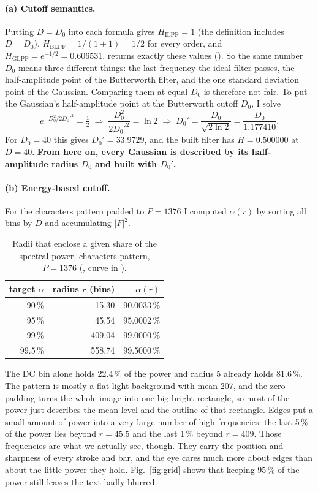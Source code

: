 \paragraph{(a) Cutoff semantics.} Putting $D=D_0$ into each formula gives
$H_\text{ILPF}=1$ (the definition includes $D=D_0$), $H_\text{BLPF}=1/(1+1)=1/2$
for every order, and $H_\text{GLPF}=e^{-1/2}=0.606531$. 
returns exactly these values (). So the same number
$D_0$ means three different things: the last frequency the ideal filter passes,
the half-amplitude point of the Butterworth filter, and the one standard
deviation point of the Gaussian. Comparing them at equal $D_0$ is therefore not
fair. To put the Gaussian's half-amplitude point at the Butterworth cutoff
$D_0$, I solve
\begin{equation}
e^{-D_0^2/2D_0'^2}=\tfrac12\;\Longrightarrow\;\frac{D_0^2}{2D_0'^2}=\ln2\;\Longrightarrow\;
D_0'=\frac{D_0}{\sqrt{2\ln2}}=\frac{D_0}{1.177410}.
\end{equation}
For $D_0=40$ this gives $D_0'=33.9729$, and the built filter has $H=0.500000$
at $D=40$. \textbf{From here on, every Gaussian is described by its
half-amplitude radius $D_0$ and built with $D_0'$.}

\paragraph{(b) Energy-based cutoff.} For the characters pattern padded to
$P=1376$ I computed $\alpha(r)$ by sorting all bins by $D$ and accumulating
$|F|^2$.

\begin{table}[H]
\centering
\begin{tabular}{rrr}
\toprule
target $\alpha$ & radius $r$ (bins) & $\alpha(r)$\\
\midrule
90\,\% & 15.30 & 90.0033\,\%\\
95\,\% & 45.54 & 95.0002\,\%\\
99\,\% & 409.04 & 99.0000\,\%\\
99.5\,\% & 558.74 & 99.5000\,\%\\
\bottomrule
\end{tabular}
\caption{Radii that enclose a given share of the spectral power, characters
pattern, $P=1376$ (, curve in
).}
\label{tab:power}
\end{table}

The DC bin alone holds 22.4\,\% of the power and radius 5 already holds
81.6\,\%. The pattern is mostly a flat light background with mean 207, and the
zero padding turns the whole image into one big bright rectangle, so most of the
power just describes the mean level and the outline of that rectangle. Edges put
a small amount of power into a very large number of high frequencies: the last
5\,\% of the power lies beyond $r=45.5$ and the last 1\,\% beyond $r=409$. Those
frequencies are what we actually see, though. They carry the position and
sharpness of every stroke and bar, and the eye cares much more about edges than
about the little power they hold. Fig.~\ref{fig:grid} shows that keeping 95\,\%
of the power still leaves the text badly blurred.

